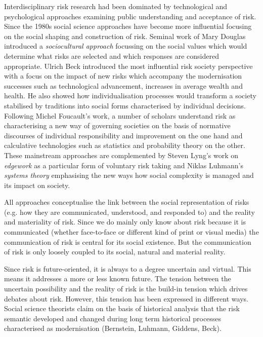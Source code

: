 Interdisciplinary risk research had been dominated by technological and psychological approaches examining public understanding and acceptance of risk. Since the 1980s social science approaches have become more influential focusing on the social shaping and construction of risk. Seminal work of Mary Douglas introduced a \emph{sociocultural approach} focussing on the social values which would determine what risks are selected and which responses are considered appropriate. Ulrich Beck introduced the most influential risk society perspective with a focus on the impact of new risks which accompany the modernisation successes such as technological advancement, increases in average wealth and health. He also showed how individualisation processes would transform a society stabilised by traditions into social forms characterised by individual decisions. Following Michel Foucault's work, a number of scholars understand risk as characterising a new way of governing societies on the basis of normative discourses of individual responsibility and improvement on the one hand and calculative technologies such as statistics and probability theory on the other. These mainstream approaches are complemented by Steven Lyng's work on \emph{edgework} as a particular form of voluntary risk taking and Niklas Luhmann's \emph{systems theory} emphasising the new ways how social complexity is managed and its impact on society.

All approaches conceptualise the link between the social representation of risks (e.g. how they are communicated, understood, and responded to) and the reality and materiality of risk. Since we do mainly only know about risk because it is communicated (whether face-to-face or different kind of print or visual media) the communication of risk is central for its social existence. But the communication of risk is only loosely coupled to its social, natural and material reality.

Since risk is future-oriented, it is always to a degree uncertain and virtual. This means it addresses a more or less known future. The tension between the uncertain possibility and the reality of risk is the build-in tension which drives debates about risk. However, this tension has been expressed in different ways. Social science theorists claim on the basis of historical analysis that the risk semantic developed and changed during long term historical processes characterised as modernisation (Bernstein, Luhmann, Giddens, Beck).

